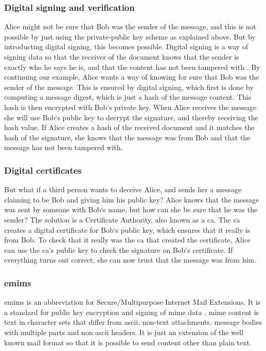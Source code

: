 \subsubsection{Digital signing and verification}
Alice might not be sure that Bob was the sender of the message, and this is not possible by just using the private-public key scheme as explained above. But by introducting digital signing, this becomes possible. Digital signing is a way of signing data so that the receiver of the document knows that the sender is exactly who he says he is, and that the content has not been tampered with \cite{bib:ds}. By continuing our example, Alice wants a way of knowing for sure that Bob was the sender of the message. This is ensured by digital signing, which first is done by computing a message digest, which is just a hash of the message content. This hash is then encrypted with Bob`s private key. When Alice receives the message she will use Bob`s public key to decrypt the signature, and thereby receiving the hash value. If Alice creates a hash of the received document and it matches the hash of the signature, she knows that the message was from Bob and that the message has not been tampered with. 

\subsubsection{Digital certificates}
But what if a third person wants to deceive Alice, and sends her a message claiming to be Bob and giving him his public key? Alice knows that the message was sent by someone with Bob`s name, but how can she be sure that he was the sender? The solution is a Certificate Authority, also known as a \gls{ca}. The \gls{ca} creates a digital certificate for Bob`s public key, which ensures that it really is from Bob. To check that it really was the \gls{ca} that created the certificate, Alice can use the \gls{ca}'s public key to check the signature on Bob`s certificate. If everything turns out correct, she can now trust that the message was from him.

\subsubsection{\gls{emims}}
\gls{emims} is an abbreviation for Secure/Multipurpose Internet Mail Extensions. It is a standard for public key encryption and signing of \gls{mime} data \cite{bib:smime}. \gls{mime} content is text in character sets that differ from \gls{ascii}, non-text attachments, message bodies with multiple parts and non \gls{ascii} headers. It is just an extension of the well known mail format so that it is possible to send content other than plain text.

